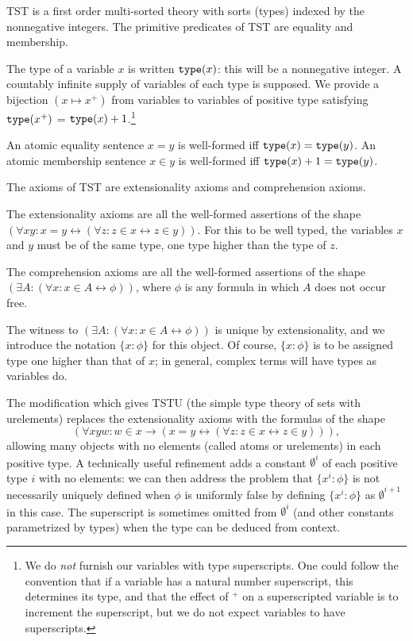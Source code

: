 \documentclass{article}
\theoremstyle{definition}
\theoremstyle{remark}
\begin{document}
TST is a first order multi-sorted theory with sorts (types) indexed by the nonnegative integers.  The primitive predicates of TST are equality and membership.

The type of a variable $x$ is written ${\tt type}(x)$:  this will be a nonnegative integer.   A countably infinite supply of variables of each type is supposed.   We provide a bijection $(x \mapsto x^+)$ from variables to variables of positive type satisfying   ${\tt type}(x^+)$ = ${\tt type}(x)+1$.\footnote{We do {\em not\/} furnish our variables with type superscripts.  One could follow the convention that if a variable has a natural number superscript, this determines its type, and that the effect of $^+$ on a superscripted variable is to increment the superscript, but we do not expect variables to have superscripts.}

An atomic equality sentence $x=y$ is well-formed iff ${\tt type}(x)={\tt type}(y)$. An atomic membership sentence $x \in y$ is well-formed iff ${\tt type}(x)+1 = {\tt type}(y)$.

The axioms of TST are extensionality axioms and comprehension axioms.

The extensionality axioms are all the well-formed assertions of the shape $(\forall xy:x=y \leftrightarrow (\forall z:z \in x \leftrightarrow z\in y))$.  For this to be well typed, the variables
$x$ and $y$ must be of the same type, one type higher than the type of $z$.

The comprehension axioms are all the well-formed assertions of the shape $(\exists A:(\forall x:x \in A \leftrightarrow \phi))$, where $\phi$ is any formula in which $A$ does not occur free.

The witness to $(\exists A:(\forall x:x \in A \leftrightarrow \phi))$ is unique by extensionality, and we introduce the notation $\{x:\phi\}$ for this object.  Of course, $\{x:\phi\}$  is to be assigned type one higher than that of $x$;  in general, complex terms will have types as variables do.

The modification which gives TSTU (the simple type theory of sets with urelements) replaces the extensionality axioms with the formulas of the shape $$(\forall xyw:w \in x \rightarrow (x=y \leftrightarrow (\forall z:z \in x \leftrightarrow z\in y))),$$  allowing many objects with no elements (called atoms or urelements)  in each positive type.  A technically useful refinement adds a constant $\emptyset^i$ of each positive type $i$ with no elements:  we can then address the problem that $\{x^i:\phi\}$ is not necessarily  uniquely defined when $\phi$ is uniformly false by defining $\{x^i:\phi\}$ as $\emptyset^{i+1}$ in this case.  The superscript is sometimes omitted from $\emptyset^i$ (and other constants parametrized by types) when the type can be deduced from context.
\end{document}
